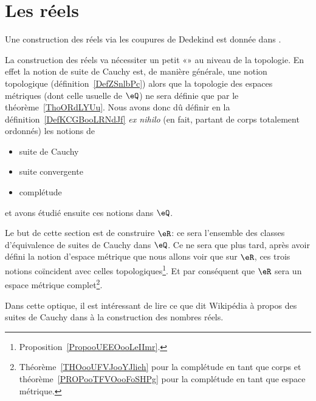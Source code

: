 \section{Les réels}

Une construction des réels via les coupures de Dedekind est donnée dans \cite{PaulinTopGmVegN}.

\begin{normaltext}      \label{NormooHRDZooRGGtCd}
    La construction des réels va nécessiter un petit «» au niveau de la topologie. En effet la notion de suite de Cauchy est, de manière générale, une notion topologique (définition~\ref{DefZSnlbPc}) alors que la topologie des espaces métriques (dont celle usuelle de \( \eQ\)) ne sera définie que par le théorème~\ref{ThoORdLYUu}. Nous avons donc dû définir en la définition~\ref{DefKCGBooLRNdJf} \emph{ex nihilo} (en fait, partant de corps totalement ordonnés) les notions de
\begin{itemize}
    \item
        suite de Cauchy
    \item
        suite convergente
    \item
        complétude
\end{itemize}
et avons étudié ensuite ces notions dans \( \eQ \).

Le but de cette section est de construire \( \eR\): ce sera l'ensemble des classes d'équivalence de suites de Cauchy dans \( \eQ\). Ce ne sera que plus tard, après avoir défini la notion d'espace métrique que nous allons voir que sur \( \eR\), ces trois notions coïncident avec celles topologiques\footnote{Proposition~\ref{PropooUEEOooLeIImr}.}. Et par conséquent que \( \eR\) sera un espace métrique complet\footnote{Théorème~\ref{THOooUFVJooYJlieh} pour la complétude en tant que corps et théorème~\ref{PROPooTFVOooFoSHPg} pour la complétude en tant que espace métrique.}.

Dans cette optique, il est intéressant de lire ce que dit Wikipédia à propos des suites de Cauchy dans  à la construction des nombres réels.
\end{normaltext}

